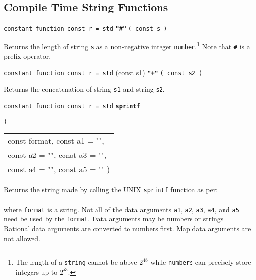 \documentclass[12pt]{article}
\newcommand{\ttkey}[1]{{\tt \bfseries #1}}
\newenvironment{indpar}[1][0.3in]%
	{\begin{list}{}%
		     {\setlength{\itemsep}{0in}%
		      \setlength{\topsep}{0in}%
		      \setlength{\parsep}{1ex}%
		      \setlength{\labelwidth}{#1}%
		      \setlength{\leftmargin}{#1}%
		      \addtolength{\leftmargin}{\labelsep}}%
	 \item}%
	{\end{list}}
\begin{document}
\subsection{Compile Time String Functions}

{\tt constant function const r = std} \ttkey{"\#"} {\tt ( const s )}
\begin{indpar}
Returns the length of string {\tt s} as a non-negative integer
{\tt number}.\footnote{The length of a {\tt string} cannot
be above $2^{48}$ while
{\tt numbers} can precisely store integers up to $2^{53}$.}
Note that {\tt \#} is a prefix operator.
\end{indpar}

{\tt constant function const r = std} (const s1) \ttkey{"+"} {\tt ( const s2 )}
\begin{indpar}
Returns the concatenation of string {\tt s1}
and string {\tt s2}.
\end{indpar}

{\tt constant function const r = std} \ttkey{sprintf}\label{SPRINTF}
    {\tt ( \begin{tabular}[t]{@{}l}
            const format, const a1 = "", \\
	    const a2 = "", const a3 = "", \\
	    const a4 = "", const a5 = "" )
	    \end{tabular} }
\begin{indpar}
Returns the string made by calling the UNIX {\tt sprintf} function as per: \\
\hspace*{1in}{\tt sprintf ( format, a1, a2, a3, a4, a5 )} \\
where {\tt format} is a string.  Not all of the data arguments
{\tt a1}, {\tt a2}, {\tt a3}, {\tt a4}, and {\tt a5}
need be used by the {\tt format}.
Data arguments may be numbers or strings.
Rational data arguments are converted to numbers first.  Map data arguments
are not allowed.
\end{indpar}
\end{document}
